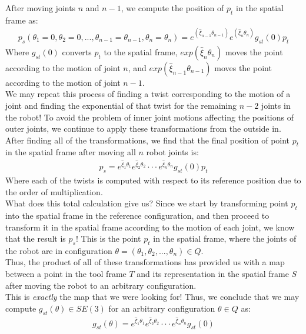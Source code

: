 \documentclass[oneside]{book}
\begin{document}
After moving joints $n$ and $n-1$, we compute the position of $p_t$ in the spatial frame as:
\begin{align}
    p_s(\theta_1 = 0, \theta_2 = 0, ..., \theta_{n-1} = \theta_{n-1}, \theta_n = \theta_n) = e^{(\hat\xi_{n-1}\theta_{n-1})}e^{(\hat\xi_n \theta_n)}g_{st}(0)p_t
\end{align}
Where $g_{st}(0)$ converts $p_t$ to the spatial frame, $exp(\hat\xi_n\theta_n)$ moves the point according to the motion of joint $n$, and $exp(\hat\xi_{n-1}\theta_{n-1})$ moves the point according to the motion of joint $n-1$.\\
We may repeat this process of finding a twist corresponding to the motion of a joint and finding the exponential of that twist for the remaining $n-2$ joints in the robot! To avoid the problem of inner joint motions affecting the positions of outer joints, we continue to apply these transformations from the outside in. \\
After finding all of the transformations, we find that the final position of point $p_t$ in the spatial frame after moving all $n$ robot joints is:
\begin{align}
    p_s = e^{\hat\xi_1\theta_1}e^{\hat\xi_2\theta_2}\cdot\cdot\cdot e^{\hat\xi_n\theta_n}g_{st}(0)p_t
\end{align}
Where each of the twists is computed with respect to its reference position due to the order of multiplication.\\
What does this total calculation give us? Since we start by transforming point $p_t$ into the spatial frame in the reference configuration, and then proceed to transform it in the spatial frame according to the motion of each joint, we know that the result is $p_s$! This is the point $p_t$ in the spatial frame, where the joints of the robot are in configuration $\theta = (\theta_1, \theta_2, ..., \theta_n)\in Q$.\\
Thus, the product of all of these transformations has provided us with a map between a point in the tool frame $T$ and its representation in the spatial frame $S$ after moving the robot to an arbitrary configuration.\\
This is \textit{exactly} the map that we were looking for! Thus, we conclude that we may compute $g_{st}(\theta) \in SE(3)$ for an arbitrary configuration $\theta \in Q$ as:
\begin{align}
    g_{st}(\theta) = e^{\hat\xi_1\theta_1}e^{\hat\xi_2\theta_2}\cdot\cdot\cdot e^{\hat\xi_n\theta_n}g_{st}(0)
\end{align}
\end{document}
